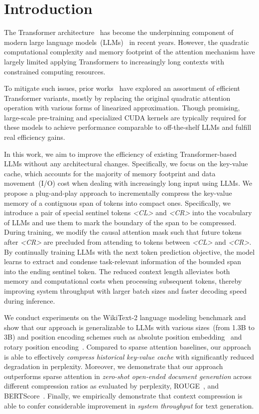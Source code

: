 \section{Introduction}
The Transformer architecture~\cite{transformer} has become the underpinning component of modern large language models~(LLMs)~\cite{gpt2,18bert,opt,llama} in recent years. However, the quadratic computational complexity and memory footprint of the attention mechanism have largely limited applying Transformers to increasingly long contexts with constrained computing resources.

To mitigate such issues, prior works~\cite{local,longformer,bigbird,reformer} have explored an assortment of efficient Transformer variants, mostly by replacing the original quadratic attention operation with various forms of linearized approximation. Though promising, large-scale pre-training and specialized CUDA kernels are typically required for these models to achieve performance comparable to off-the-shelf LLMs and fulfill real efficiency gains.

In this work, we aim to improve the efficiency of existing Transformer-based LLMs without any architectural changes. Specifically, we focus on the key-value cache, which accounts for the majority of memory footprint and data movement~(I/O) cost when dealing with increasingly long input using LLMs. We propose a plug-and-play approach to incrementally compress the key-value memory of a contiguous span of tokens into compact ones. Specifically, we introduce a pair of special sentinel tokens \textit{<CL>} and \textit{<CR>} into the vocabulary of LLMs and use them to mark the boundary of the span to be compressed. During training, we modify the causal attention mask such that future tokens after \textit{<CR>} are precluded from attending to tokens between \textit{<CL>} and \textit{<CR>}. By continually training LLMs with the next token prediction objective, the model learns to extract and condense task-relevant information of the bounded span into the ending sentinel token. The reduced context length alleviates both memory and computational costs when processing subsequent tokens, thereby improving system throughput with larger batch sizes and faster decoding speed during inference.

We conduct experiments on the WikiText-2 language modeling benchmark and show that 
our approach is generalizable to LLMs with various sizes~(from 1.3B to 3B) and 
position encoding schemes such as absolute position embedding~\cite{18bert} 
and rotary position encoding~\cite{rope}. Compared to sparse attention baselines, our approach is able to effectively \textit{compress historical key-value cache} with significantly reduced degradation in perplexity.  Moreover, 
we demonstrate that our approach outperforms sparse attention in \textit{zero-shot open-ended document generation} across different compression ratios as 
evaluated by perplexity, ROUGE~\cite{rouge}, and BERTScore~\cite{bertscore}. 
Finally, we empirically demonstrate that context compression is able to confer considerable improvement in \textit{system throughput} for text generation.
